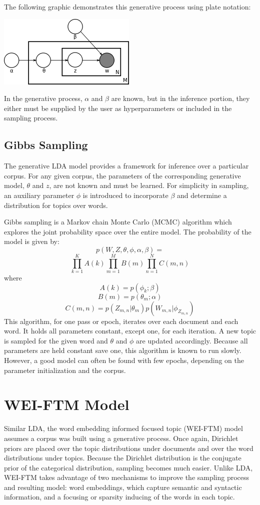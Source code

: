 \documentclass[letterpaper, 11pt]{article}
\begin{document}
\begin{multicols}{2}
\noindent The following graphic demonstrates this generative process using plate notation:

\begin{center}
\includegraphics[scale=.75]{lda}
\end{center}

In the generative process, $\alpha$ and $\beta$ are known, but in the inference portion, they either
must be supplied by the user as hyperparameters or included in the sampling process.

\subsection{Gibbs Sampling}
The generative LDA model provides a framework for inference over a particular corpus.
For any given corpus, the parameters of the corresponding generative model, $\theta$ and $z$, are
not known and must be learned.
For simplicity in sampling, an auxiliary parameter $\phi$ is introduced to incorporate $\beta$ and
determine a distribution for topics over words.

Gibbs sampling is a Markov chain Monte Carlo (MCMC) algorithm which explores the joint probability
space over the entire model.
The probability of the model is given by:
\[
	p(W, Z, \theta, \phi, \alpha, \beta) =
\]
\[
	\prod\limits_{k=1}^{K} A(k)
	\prod\limits_{m=1}^{M} B(m)
	\prod\limits_{n=1}^{N} C(m,n)
\]
\noindent where
\[
	A(k) = p(\phi_k; \beta)
\]
\[
	B(m) = p(\theta_m; \alpha)
\]
\[
	C(m,n) = p(Z_{m,n} | \theta_m) p(W_{m,n}|\phi_{Z_{m,n}})
\]
\noindent This algorithm, for one pass or epoch, iterates over each document and each word.
It holds all parameters constant, except one, for each iteration.
A new topic is sampled for the given word and $\theta$ and $\phi$ are updated accordingly.
Because all parameters are held constant save one, this algorithm is known to run slowly.
However, a good model can often be found with few epochs, depending on the parameter initialization
and the corpus.

\section{WEI-FTM Model}
Similar LDA, the word embedding informed focused topic (WEI-FTM) model assumes a corpus was built
using a generative process.
Once again, Dirichlet priors are placed over the topic distributions under documents and over the
word distributions under topics.
Because the Dirichlet distribution is the conjugate prior of the categorical distribution, sampling
becomes much easier.
Unlike LDA, WEI-FTM takes advantage of two mechanisms to improve the sampling process and resulting
model: word embeddings, which capture semantic and syntactic information, and a focusing or
sparsity inducing of the words in each topic.


\end{multicols}
\end{document}
